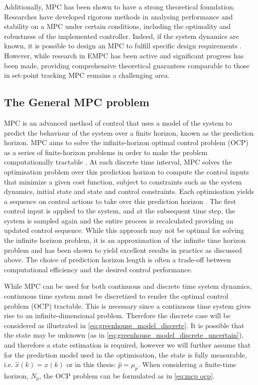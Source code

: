 Additionally, MPC has been shown to have a strong theoretical foundation. Researches have developed rigorous methods in analysing performance and stability on a MPC under certain conditions, including the optimality and robustness of the implemented controller. Indeed, if the system dynamics are known, it is possible to design an MPC to fulfill specific design requirements \cite{rawlingsModelPredictiveControl2017}. However, while research in EMPC has been active and significant progress has been made, providing comprehensive theoretical guarantees comparable to those in set-point tracking MPC remains a challenging area.

\subsection {The General MPC problem}\label{ssection:general-mpc}
MPC is an advanced method of control that uses a model of the system to predict the behaviour of the system over a finite horizon, known as the prediction horizon. MPC aims to solve the infinite-horizon optimal control problem (OCP) as a series of finite-horizon problems in order to make the problem computationally tractable \cite{beckenbachAddressingInfinitehorizonOptimization2018}. At each discrete time interval, MPC solves the optimisation problem over this prediction horizon to compute the control inputs that minimize a given cost function, subject to constraints such as the system dynamics, initial state and state and control constraints. Each optimisation yields a sequence on control actions to take over this prediction horizon . The first control input is applied to the system, and at the subsequent time step, the system is sampled again and the entire process is recalculated providing an updated control sequence. While this approach may not be optimal for solving the infinite horizon problem, it is an approximation of the infinite time horizon problem and has been shown to yield excellent results in practice as discussed above. The choice of prediction horizon length is often a trade-off between computational efficiency and the desired control performance. 

While MPC can be used for both continuous and discrete time system dynamics,  continuous time system must be discretized to render the optimal control problem (OCP) tractable. This is necessary since a continuous time system gives rise to an infinite-dimensional problem. Therefore the discrete case will be considered as illustrated in \autoref{eq:greenhouse_model_discrete}.
It is possible that the state may be unknown (as in \autoref{eq:greenhouse_model_discrete_uncertain}), and therefore a state estimation is required, however we will further assume that for the prediction model used in the optimisation, the state is fully measurable, i.e. $\hat x(k) = x(k)$ or in this thesis: $\hat{p} = \mu_p$. When considering a finite-time horizon, $N_p$, the OCP problem can be formulated as in \autoref{eq:mcp ocp}.

